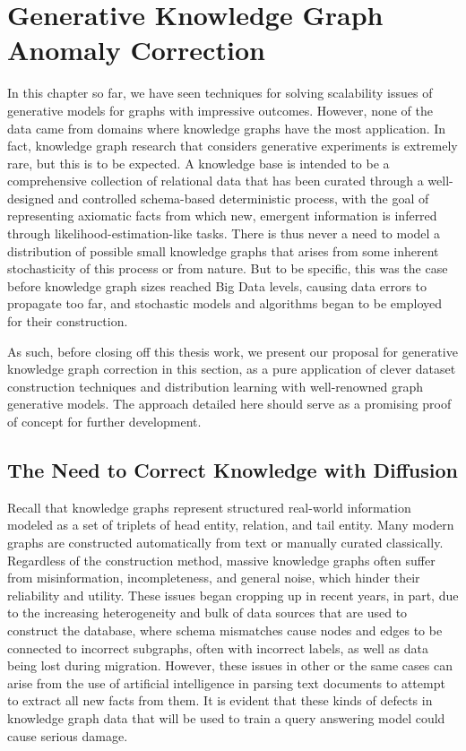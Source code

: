 \section{Generative Knowledge Graph Anomaly Correction}
\label{sec: kg_generation}

In this chapter so far, we have seen techniques for solving scalability issues of generative models for graphs with impressive outcomes. However, none of the data came from domains where knowledge graphs have the most application. In fact, knowledge graph research that considers generative experiments is extremely rare, but this is to be expected. A knowledge base is intended to be a comprehensive collection of relational data that has been curated through a well-designed and controlled schema-based deterministic process, with the goal of representing axiomatic facts from which new, emergent information is inferred through likelihood-estimation-like tasks. There is thus never a need to model a distribution of possible small knowledge graphs that arises from some inherent stochasticity of this process or from nature. But to be specific, this was the case before knowledge graph sizes reached Big Data levels, causing data errors to propagate too far, and stochastic models and algorithms began to be employed for their construction. 

As such, before closing off this thesis work, we present our proposal for generative knowledge graph correction in this section, as a pure application of clever dataset construction techniques and distribution learning with well-renowned graph generative models. The approach detailed here should serve as a promising proof of concept for further development. 

\subsection{The Need to Correct Knowledge with Diffusion}

Recall that knowledge graphs represent structured real-world information modeled as a set of triplets
of head entity, relation, and tail entity. Many modern graphs are constructed automatically from
text or manually curated classically. Regardless of the construction method, massive knowledge graphs often suffer from misinformation, incompleteness, and general noise, which hinder their reliability and utility. These issues began cropping up in recent years, in part, due to the increasing heterogeneity and bulk of data sources that are used to construct the database, where schema mismatches cause nodes and edges to be connected to incorrect subgraphs, often with incorrect labels, as well as data being lost during migration. However, these issues in other or the same cases can arise from the use of artificial intelligence in parsing text documents to attempt to extract all new facts from them. It is evident that these kinds of defects in knowledge graph data that will be used to train a query answering model could cause serious damage.

